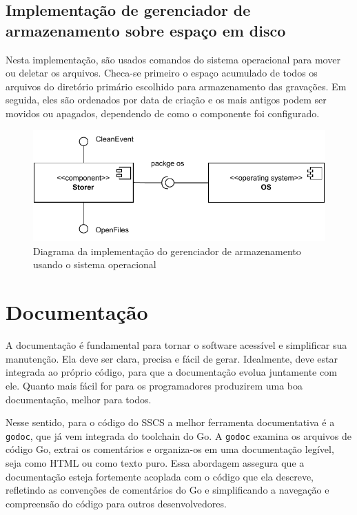 \documentclass[12pt, %
openright, 
oneside, %
a4paper,    %
brazil]{facom-ufu-abntex2}
\begin{document}
\subsection{Implementação de gerenciador de armazenamento sobre espaço em disco}
Nesta implementação, são usados comandos do sistema operacional para mover ou
deletar os arquivos. Checa-se primeiro o espaço acumulado de todos os arquivos
do diretório primário escolhido para armazenamento das gravações. Em seguida,
eles são ordenados por data de criação e os mais antigos podem ser movidos ou
apagados, dependendo de como o componente foi configurado.

\begin{figure}[!ht]
	\centering
	\includegraphics[width=0.8\linewidth]{storer_os.pdf}
	\caption[Diagrama da implementação do gerenciador de armazenamento usando o sistema operacional]{Diagrama da implementação do gerenciador de armazenamento usando o sistema operacional }
	\label{fig:graficosVariandoTamanhoRede}
\end{figure}



\section{Documentação}
A documentação é fundamental para tornar o software acessível e simplificar sua
manutenção. Ela deve ser clara, precisa e fácil de gerar. Idealmente, deve
estar integrada ao próprio código, para que a documentação evolua juntamente
com ele. Quanto mais fácil for para os programadores produzirem uma boa
documentação, melhor para todos.

Nesse sentido, para o código do SSCS a melhor ferramenta documentativa é a
\texttt{godoc}, que já vem integrada do toolchain do Go. A \texttt{godoc}
examina os arquivos de código Go, extrai os comentários e organiza-os em uma
documentação legível, seja como HTML ou como texto puro. Essa abordagem
assegura que a documentação esteja fortemente acoplada com o código que ela
descreve, refletindo as convenções de comentários do Go e simplificando a
navegação e compreensão do código para outros desenvolvedores.
\end{document}
